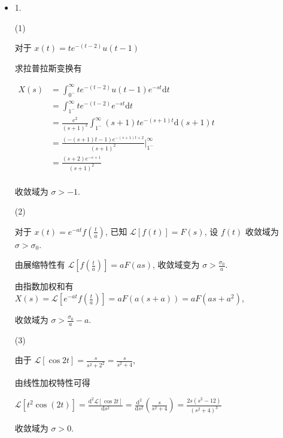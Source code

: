 \documentclass[a4paper,UTF8]{article}
\numberwithin{equation}{section}
\begin{document}
	
	\begin{framed}
		\begin{spacing}{1.5}
			\begin{itemize}
        \item 1.

        (1)
        
        对于 $x(t) = te^{-(t-2)}u(t-1)$
        
        求拉普拉斯变换有
        
        $
        \begin{aligned}
        X(s) &= \int_{0^{-}}^{\infty}te^{-(t-2)}u(t-1)e^{-st}\mathrm{d}t  \\
        &= \int_{1^{-}}^{\infty}te^{-(t-2)}e^{-st}\mathrm{d}t  \\
        &= \frac{e^{2}}{(s+1)^{2}}\int_{1^{-}}^{\infty}(s+1)te^{-(s+1)t}\mathrm{d}(s+1)t  \\
        &= \frac{(- (s + 1)t - 1) e^{- (s + 1)t + 2}}{(s+1)^{2}}|_{1^{-}}^{\infty}  \\
        &= \frac{( s + 2 ) e^{- s + 1}}{(s+1)^{2}}  \\
        \end{aligned}
        $
        
        收敛域为 $\sigma > -1$.
        
        (2)
        
        对于 $\displaystyle x(t) = e^{-at}f(\frac{t}{a})$, 已知 $\mathcal{L}[f(t)] = F(s)$, 设 $f(t)$ 收敛域为 $\sigma > \sigma_0$.
        
        由展缩特性有 $\displaystyle \mathcal{L}[f(\frac{t}{a})] = aF(as)$, 收敛域变为 $\displaystyle \sigma > \frac{\sigma_0}{a}$.
        
        由指数加权和有 $\displaystyle X(s) = \mathcal{L}[e^{-at}f(\frac{t}{a})] = aF(a(s+a)) = aF(as+a^{2})$,
        
        收敛域为 $\displaystyle \sigma > \frac{\sigma_0}{a}-a$.
        
        (3)
        
        由于 $\displaystyle \mathcal{L}[\cos 2t] = \frac{s}{s^{2}+2^{2}} = \frac{s}{s^{2}+4}$,
        
        由线性加权特性可得
        
        $\displaystyle \mathcal{L}[t^{2}\cos(2t)] = \frac{\mathrm{d}^{2}\mathcal{L}[\cos 2t]}{\mathrm{d}s^{2}} = \frac{\mathrm{d}^{2}}{\mathrm{d}s^{2}}(\frac{s}{s^{2}+4}) = \frac{2 s (s^{2} - 12)}{(s^{2} + 4)^{3}}$
        
        收敛域为 $\displaystyle \sigma > 0$.
        

\end{itemize}
\end{spacing}
\end{framed}
\end{document}
